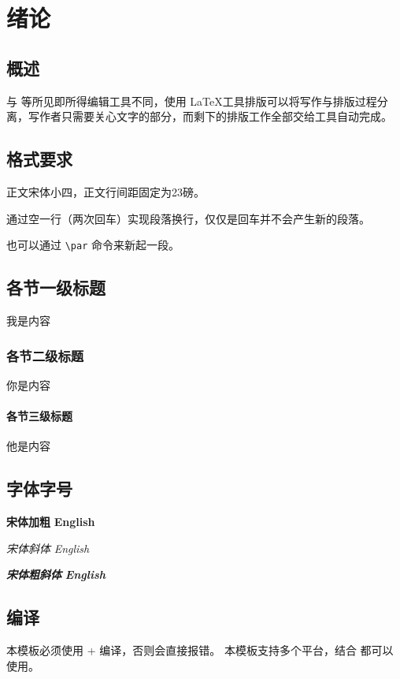 
\chapter{绪论}

\section{概述}

与  等所见即所得编辑工具不同，使用 \LaTeX 工具排版可以将写作与排版过程分离，写作者只需要关心文字的部分，而剩下的排版工作全部交给工具自动完成。

\section{格式要求}
正文宋体小四，正文行间距固定为23磅。

通过空一行（两次回车）实现段落换行，仅仅是回车并不会产生新的段落。\par
也可以通过 \verb|\par| 命令来新起一段。

\section{各节一级标题}
我是内容

\subsection{各节二级标题}
你是内容

\subsubsection{各节三级标题}
他是内容

\section{字体字号}
{\songti \bfseries 宋体加粗} {\textbf{English}}

{\songti \itshape 宋体斜体} {\textit{English}}

{\songti \bfseries \itshape 宋体粗斜体} {\textbf{\textit{English}}}

\section{编译}
本模板必须使用  +  编译，否则会直接报错。 本模板支持多个平台，结合  都可以使用。